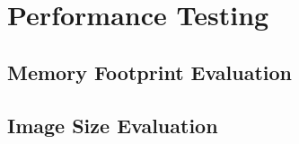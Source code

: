 
\section{Performance Testing}
\label{sec:performance-testing}

\subsection{Memory Footprint Evaluation}
\label{subsec:memory-footprint-evaluation}

\subsection{Image Size Evaluation}
\label{subsec:image-size-evaluation}

